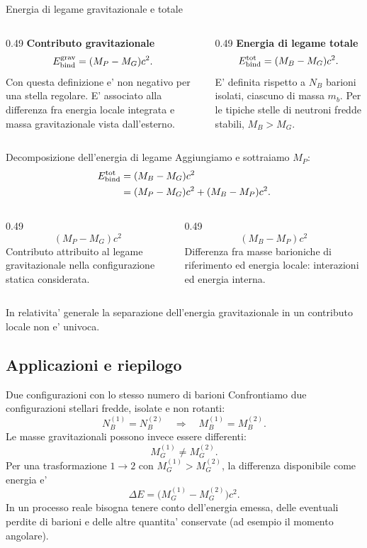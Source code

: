 \begin{frame}{Energia di legame gravitazionale e totale}
\small
\begin{columns}[T,onlytextwidth]
\begin{column}{0.49\textwidth}
\textbf{Contributo gravitazionale}
\[
E_{\rm bind}^{\rm grav}
=(M_P-M_G)c^2.
\]
\medskip
Con questa definizione e' non negativo
per una stella regolare.
\medskip
E' associato alla differenza fra energia
locale integrata e massa gravitazionale
vista dall'esterno.
\end{column}
\begin{column}{0.49\textwidth}
\textbf{Energia di legame totale}
\[
E_{\rm bind}^{\rm tot}
=(M_B-M_G)c^2.
\]
\medskip
E' definita rispetto a $N_B$ barioni
isolati, ciascuno di massa $m_b$.
\medskip
Per le tipiche stelle di neutroni fredde
stabili, $M_B>M_G$.
\end{column}
\end{columns}
\end{frame}

\begin{frame}{Decomposizione dell'energia di legame}
\small
Aggiungiamo e sottraiamo $M_P$:
\[
\begin{aligned}
E_{\rm bind}^{\rm tot}
&=(M_B-M_G)c^2\\
&=(M_P-M_G)c^2+(M_B-M_P)c^2.
\end{aligned}
\]
\begin{columns}[T,onlytextwidth]
\begin{column}{0.49\textwidth}
\[
(M_P-M_G)c^2
\]
Contributo attribuito al legame
gravitazionale nella configurazione
statica considerata.
\end{column}
\begin{column}{0.49\textwidth}
\[
(M_B-M_P)c^2
\]
Differenza fra masse barioniche
di riferimento ed energia locale:
interazioni ed energia interna.
\end{column}
\end{columns}
\medskip
In relativita' generale la separazione dell'energia gravitazionale
in un contributo locale non e' univoca.
\end{frame}

\subsection{Applicazioni e riepilogo}

\begin{frame}{Due configurazioni con lo stesso numero di barioni}
\small
Confrontiamo due configurazioni stellari fredde, isolate e non rotanti:
\[
N_B^{(1)}=N_B^{(2)}
\quad\Longrightarrow\quad M_B^{(1)}=M_B^{(2)}.
\]
Le masse gravitazionali possono invece essere differenti:
\[
M_G^{(1)}\ne M_G^{(2)}.
\]
Per una trasformazione $1\to2$ con $M_G^{(1)}>M_G^{(2)}$,
la differenza disponibile come energia e'
\[
\Delta E=\bigl(M_G^{(1)}-M_G^{(2)}\bigr)c^2.
\]
\medskip
In un processo reale bisogna tenere conto dell'energia emessa,
delle eventuali perdite di barioni e delle altre quantita' conservate
(ad esempio il momento angolare).
\end{frame}

